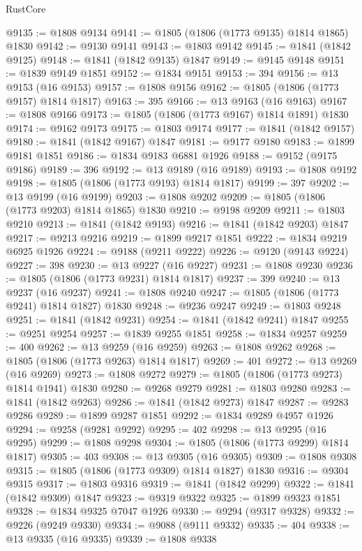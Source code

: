 \begin{lexlean}{RustCore}
\begin{coremodule}
@9135 := @1808 @9134
@9141 := @1805 (@1806 (@1773 @9135) @1814 @1865) @1830
@9142 := @9130 @9141
@9143 := @1803 @9142
@9145 := @1841 (@1842 @9125)
@9148 := @1841 (@1842 @9135) @1847
@9149 := @9145 @9148
@9151 := @1839 @9149 @1851
@9152 := @1834 @9151
@9153 := 394
@9156 := @13 @9153 (@16 @9153)
@9157 := @1808 @9156
@9162 := @1805 (@1806 (@1773 @9157) @1814 @1817)
@9163 := 395
@9166 := @13 @9163 (@16 @9163)
@9167 := @1808 @9166
@9173 := @1805 (@1806 (@1773 @9167) @1814 @1891) @1830
@9174 := @9162 @9173
@9175 := @1803 @9174
@9177 := @1841 (@1842 @9157)
@9180 := @1841 (@1842 @9167) @1847
@9181 := @9177 @9180
@9183 := @1899 @9181 @1851
@9186 := @1834 @9183 @6881 @1926
@9188 := @9152 (@9175 @9186)
@9189 := 396
@9192 := @13 @9189 (@16 @9189)
@9193 := @1808 @9192
@9198 := @1805 (@1806 (@1773 @9193) @1814 @1817)
@9199 := 397
@9202 := @13 @9199 (@16 @9199)
@9203 := @1808 @9202
@9209 := @1805 (@1806 (@1773 @9203) @1814 @1865) @1830
@9210 := @9198 @9209
@9211 := @1803 @9210
@9213 := @1841 (@1842 @9193)
@9216 := @1841 (@1842 @9203) @1847
@9217 := @9213 @9216
@9219 := @1899 @9217 @1851
@9222 := @1834 @9219 @6925 @1926
@9224 := @9188 (@9211 @9222)
@9226 := @9120 (@9143 @9224)
@9227 := 398
@9230 := @13 @9227 (@16 @9227)
@9231 := @1808 @9230
@9236 := @1805 (@1806 (@1773 @9231) @1814 @1817)
@9237 := 399
@9240 := @13 @9237 (@16 @9237)
@9241 := @1808 @9240
@9247 := @1805 (@1806 (@1773 @9241) @1814 @1827) @1830
@9248 := @9236 @9247
@9249 := @1803 @9248
@9251 := @1841 (@1842 @9231)
@9254 := @1841 (@1842 @9241) @1847
@9255 := @9251 @9254
@9257 := @1839 @9255 @1851
@9258 := @1834 @9257
@9259 := 400
@9262 := @13 @9259 (@16 @9259)
@9263 := @1808 @9262
@9268 := @1805 (@1806 (@1773 @9263) @1814 @1817)
@9269 := 401
@9272 := @13 @9269 (@16 @9269)
@9273 := @1808 @9272
@9279 := @1805 (@1806 (@1773 @9273) @1814 @1941) @1830
@9280 := @9268 @9279
@9281 := @1803 @9280
@9283 := @1841 (@1842 @9263)
@9286 := @1841 (@1842 @9273) @1847
@9287 := @9283 @9286
@9289 := @1899 @9287 @1851
@9292 := @1834 @9289 @4957 @1926
@9294 := @9258 (@9281 @9292)
@9295 := 402
@9298 := @13 @9295 (@16 @9295)
@9299 := @1808 @9298
@9304 := @1805 (@1806 (@1773 @9299) @1814 @1817)
@9305 := 403
@9308 := @13 @9305 (@16 @9305)
@9309 := @1808 @9308
@9315 := @1805 (@1806 (@1773 @9309) @1814 @1827) @1830
@9316 := @9304 @9315
@9317 := @1803 @9316
@9319 := @1841 (@1842 @9299)
@9322 := @1841 (@1842 @9309) @1847
@9323 := @9319 @9322
@9325 := @1899 @9323 @1851
@9328 := @1834 @9325 @7047 @1926
@9330 := @9294 (@9317 @9328)
@9332 := @9226 (@9249 @9330)
@9334 := @9088 (@9111 @9332)
@9335 := 404
@9338 := @13 @9335 (@16 @9335)
@9339 := @1808 @9338

\end{coremodule}
\end{lexlean}
